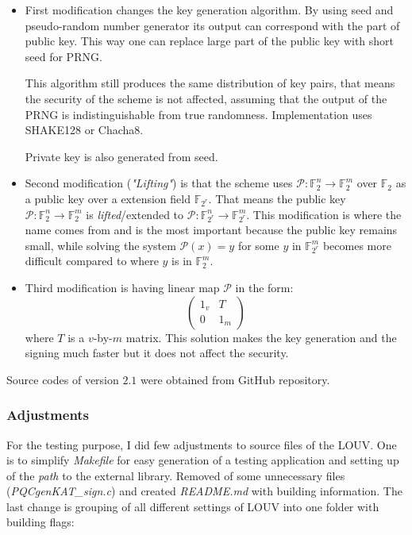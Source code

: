 \documentclass[thesis=M,english]{FITthesis}[2019/12/23]
\begin{document}
\begin{itemize}
\item	First modification changes the key generation algorithm. By using seed and pseudo-random number generator its output can correspond with the part of public key. This way one can replace large part of the public key with short seed for PRNG.

This algorithm still produces the same distribution of key pairs, that means the security of the scheme is not affected, assuming that the output of the PRNG is indistinguishable from true randomness. Implementation uses SHAKE128 or Chacha8.

Private key is also generated from seed.

\item	Second modification (\textit{"Lifting"}) is that the scheme uses $\mathcal{P}:\mathbb{F}_2^n \rightarrow \mathbb{F}_2^m$ over $\mathbb{F}_2$ as a public key over a extension field $\mathbb{F}_{2^r}$. That means the public key $\mathcal{P}:\mathbb{F}_2^n \rightarrow \mathbb{F}_2^m$ is \textit{lifted}/extended to $\mathcal{P}:\mathbb{F}_{2^r}^n \rightarrow \mathbb{F}_{2^r}^m$. This modification is where the name comes from and is the most important because the public key remains small, while solving the system $\mathcal{P}(x) = y$ for some $y$ in $\mathbb{F}_{2^r}^m$ becomes more difficult compared to where $y$ is in $\mathbb{F}_{2}^m$.\cite{L-LIFTING}

\item	Third modification is having linear map $\mathcal{P}$ in the form:
\begin{equation*}
\begin{pmatrix}
1_v & T\\
0 & 1_m
\end{pmatrix}
\end{equation*}
where $T$ is a $v$-by-$m$ matrix. This solution makes the key generation and the signing much faster\cite{L-CZYP} but it does not affect the security.\cite{L-EQ-KEYS}
\end{itemize}

Source codes of version $2.1$ were obtained from GitHub repository.

\subsubsection{Adjustments}
For the testing purpose, I did few adjustments to source files of the LOUV. One is to simplify \textit{Makefile} for easy generation of a testing application and setting up of the \textit{path} to the external library. Removed of some unnecessary files (\textit{PQCgenKAT\_sign.c}) and created \textit{README.md} with building information. The last change is grouping of all different settings of LOUV into one folder with building flags:
\end{document}
